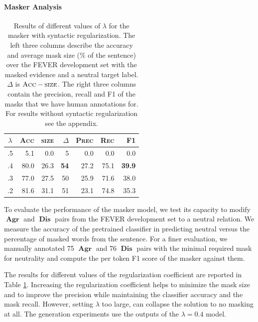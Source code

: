\documentclass[letterpaper]{article}
\DeclareMathOperator{\A}{\boldsymbol{Agr}}
\DeclareMathOperator{\D}{\boldsymbol{Dis}}
\begin{document}
\paragraph{Masker Analysis}

\begin{table}[t]
\centering
\begin{adjustbox}{width=0.27\columnwidth}
\begin{tabular}{c|rrr|rrr}
\toprule
$\lambda$ & \textsc{Acc} & \textsc{size} & $\Delta$ & \textsc{Prec} & \textsc{Rec} & \textsc{F1}   \\ \midrule
.5 & 5.1      & 0.0         & 5   & 0.0    & 0.0      & 0.0    \\
.4 & 80.0       & 26.3      & \textbf{54}  & 27.2 & 75.1   & \textbf{39.9} \\
.3 & 77.0       & 27.5      & 50  & 25.9 & 71.6   & 38.0   \\
.2 & 81.6     & 31.1      & 51  & 23.1 & 74.8   & 35.3 \\
\bottomrule
\end{tabular}
\end{adjustbox}
\caption{Results of different values of $\lambda$ for the masker with syntactic regularization. The left three columns describe the accuracy and average mask size (\% of the sentence) over the FEVER development set with the masked evidence and a neutral target label. $\Delta$ is $\textsc{Acc}-\textsc{size}$. The right three columns contain the precision, recall and F1 of the masks that we have human annotations for. For results without syntactic regularization see the appendix.}
\label{tab:mask_res}
\end{table}


To evaluate the performance of the masker model, we test its capacity to modify $\A$ and $\D$ pairs from the FEVER development set to a neutral relation. We measure the accuracy of the pretrained classifier in predicting neutral versus the percentage of masked words from the sentence. For a finer evaluation, we manually annotated 75 $\A$ and 76 $\D$ pairs with the minimal required mask for neutrality and compute the per token \textsc{F1} score of the masker against them.

The results for different values of the regularization coefficient are reported in Table \ref{tab:mask_res}. Increasing the regularization coefficient helps to minimize the mask size and to improve the precision while maintaining the classifier accuracy and the mask recall. However, setting $\lambda$ too large, can collapse the solution to no masking at all. The generation experiments use the outputs of the $\lambda=0.4$ model.
\end{document}
